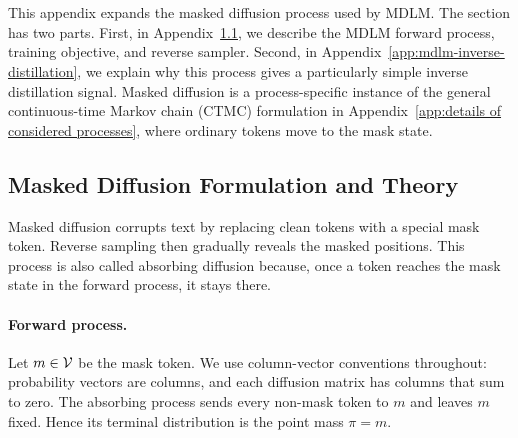 \section{\texorpdfstring{}{Masked Diffusion}}
\label{app:absorbing process}

\begin{reviewblock}
This appendix expands the masked diffusion process used by MDLM. The section
has two parts. First, in Appendix~\ref{app:mdlm-formulation-theory}, we
describe the MDLM forward process, training objective, and reverse sampler.
Second, in Appendix~\ref{app:mdlm-inverse-distillation}, we explain why this
process gives a particularly simple inverse distillation signal. Masked
diffusion is a process-specific instance of the general continuous-time Markov
chain (CTMC) formulation in
Appendix~\ref{app:details of considered processes}, where ordinary tokens move
to the mask state.

\subsection{\texorpdfstring{Masked Diffusion Formulation and Theory}{Masked Diffusion Formulation and Theory}}
\label{app:mdlm-formulation-theory}

Masked diffusion corrupts text by replacing clean tokens with a special mask
token. Reverse sampling then gradually reveals the masked positions. This
process is also called absorbing diffusion because, once a token reaches the
mask state in the forward process, it stays there.

\paragraph{Forward process.}
Let $m\in\mathcal{V}$ be the mask token. We use column-vector
conventions throughout: probability vectors are columns, and each diffusion
matrix has columns that sum to zero. The absorbing process sends every
non-mask token to $m$ and leaves $m$ fixed. Hence its terminal distribution is
the point mass $\pi=m$.


\end{reviewblock}
